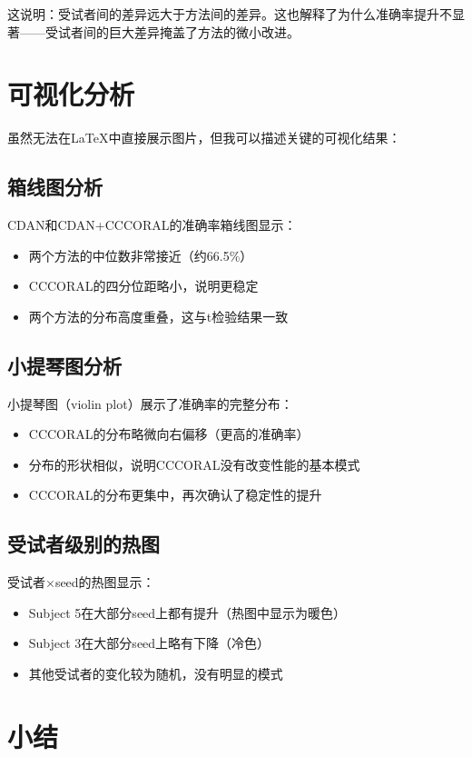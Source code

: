 \documentclass[12pt,a4paper]{ctexart}
\begin{document}
这说明：受试者间的差异远大于方法间的差异。这也解释了为什么准确率提升不显著——受试者间的巨大差异掩盖了方法的微小改进。

\section{可视化分析}

虽然无法在LaTeX中直接展示图片，但我可以描述关键的可视化结果：

\subsection{箱线图分析}

CDAN和CDAN+CCCORAL的准确率箱线图显示：
\begin{itemize}
    \item 两个方法的中位数非常接近（约66.5\%）
    \item CCCORAL的四分位距略小，说明更稳定
    \item 两个方法的分布高度重叠，这与t检验结果一致
\end{itemize}

\subsection{小提琴图分析}

小提琴图（violin plot）展示了准确率的完整分布：
\begin{itemize}
    \item CCCORAL的分布略微向右偏移（更高的准确率）
    \item 分布的形状相似，说明CCCORAL没有改变性能的基本模式
    \item CCCORAL的分布更集中，再次确认了稳定性的提升
\end{itemize}

\subsection{受试者级别的热图}

受试者×seed的热图显示：
\begin{itemize}
    \item Subject 5在大部分seed上都有提升（热图中显示为暖色）
    \item Subject 3在大部分seed上略有下降（冷色）
    \item 其他受试者的变化较为随机，没有明显的模式
\end{itemize}

\section{小结}
\end{document}
